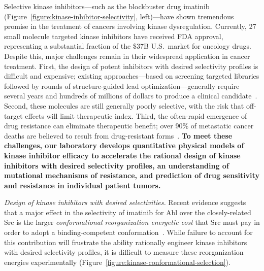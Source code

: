 \documentclass[10pt]{article}
\begin{document}
Selective kinase inhibitors---such as the blockbuster drug imatinib (Figure~\ref{figure:kinase-inhibitor-selectivity}, left)---have shown tremendous promise in the treatment of cancers involving kinase dysregulation.
Currently, 27 small molecule targeted kinase inhibitors have received FDA approval, representing a substantial fraction of the \$37B U.S.~market for oncology drugs.
Despite this, major challenges remain in their widespread application in cancer treatment.
First, the design of potent inhibitors with desired selectivity profiles is difficult and expensive; existing approaches---based on screening targeted libraries followed by rounds of structure-guided lead optimization---generally require several years and hundreds of millions of dollars to produce a clinical candidate~\cite{paul:2010:nrdd:pharma-research-development}.
Second, these molecules are still generally poorly selective, with the risk that off-target effects will limit therapeutic index.
Third, the often-rapid emergence of drug resistance can eliminate therapeutic benefit; over 90\% of metastatic cancer deaths are believed to result from drug-resistant forms~\cite{longley-johnston:j-pathol:2005:drug-resistance}.
{\bf To meet these challenges, our laboratory develops quantitative physical models of kinase inhibitor efficacy to accelerate the rational design of kinase inhibitors with desired selectivity profiles, an understanding of mutational mechanisms of resistance, and prediction of drug sensitivity and resistance in individual patient tumors.}

\emph{Design of kinase inhibitors with desired selectivities.}
Recent evidence suggests that a major effect in the selectivity of imatinib for Abl over the closely-related Src is the larger \emph{conformational reorganization energetic cost} that Src must pay in order to adopt a binding-competent conformation~\cite{seeliger:2007:structure:imatinib-binding,simonson:j-biol-chem:2010:imatinib-selectivity,roux:pnas:2013:gleevec-selectivity}.
While failure to account for this contribution will frustrate the ability rationally engineer kinase inhibitors with desired selectivity profiles, it is difficult to measure these reorganization energies experimentally (Figure~\ref{figure:kinase-conformational-selection}).
\end{document}
